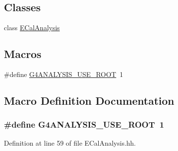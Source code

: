 \subsection*{Classes}
\begin{DoxyCompactItemize}
\item 
class \hyperlink{class_e_cal_analysis}{E\-Cal\-Analysis}
\end{DoxyCompactItemize}
\subsection*{Macros}
\begin{DoxyCompactItemize}
\item 
\#define \hyperlink{_e_cal_analysis_8hh_a6800cf6c11218cbba09b5f4338892b52}{G4\-A\-N\-A\-L\-Y\-S\-I\-S\-\_\-\-U\-S\-E\-\_\-\-R\-O\-O\-T}~1
\end{DoxyCompactItemize}


\subsection{Macro Definition Documentation}
\hypertarget{_e_cal_analysis_8hh_a6800cf6c11218cbba09b5f4338892b52}{
\subsubsection[{G4\-A\-N\-A\-L\-Y\-S\-I\-S\-\_\-\-U\-S\-E\-\_\-\-R\-O\-O\-T}]{\setlength{\rightskip}{0pt plus 5cm}\#define G4\-A\-N\-A\-L\-Y\-S\-I\-S\-\_\-\-U\-S\-E\-\_\-\-R\-O\-O\-T~1}}\label{_e_cal_analysis_8hh_a6800cf6c11218cbba09b5f4338892b52}


Definition at line 59 of file E\-Cal\-Analysis.\-hh.

